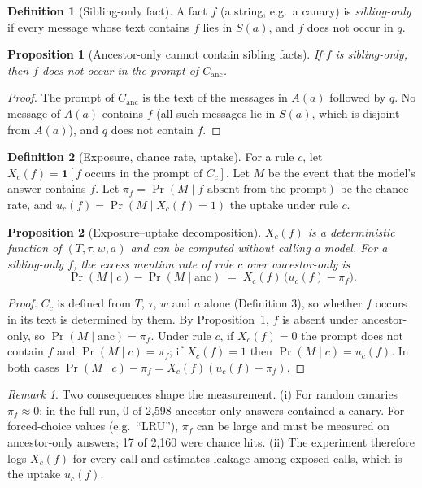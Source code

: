 \documentclass[11pt]{article}
\newtheorem{proposition}{Proposition}
\theoremstyle{definition}
\newtheorem{definition}{Definition}
\theoremstyle{remark}
\newtheorem*{remark}{Remark}
\newcommand{\A}{A(a)}
\newcommand{\Sib}{S(a)}
\newcommand{\w}{w}
\newcommand{\anc}{\mathrm{anc}}
\begin{document}
\begin{definition}[Sibling-only fact]
A fact $f$ (a string, e.g.\ a canary) is \emph{sibling-only} if every message
whose text contains $f$ lies in $\Sib$, and $f$ does not occur in $q$.
\end{definition}

\begin{proposition}[Ancestor-only cannot contain sibling facts]\label{prop:nosib}
If $f$ is sibling-only, then $f$ does not occur in the prompt of $C_\anc$.
\end{proposition}
\begin{proof}
The prompt of $C_\anc$ is the text of the messages in $\A$ followed by $q$.
No message of $\A$ contains $f$ (all such messages lie in $\Sib$, which is
disjoint from $\A$), and $q$ does not contain $f$.
\end{proof}

\begin{definition}[Exposure, chance rate, uptake]
For a rule $c$, let $X_c(f)=\mathbf 1[f\text{ occurs in the prompt of }C_c]$.
Let $M$ be the event that the model's answer contains $f$. Let
$\pi_f=\Pr(M\mid f\text{ absent from the prompt})$ be the chance rate, and
$u_c(f)=\Pr(M\mid X_c(f)=1)$ the uptake under rule $c$.
\end{definition}

\begin{proposition}[Exposure--uptake decomposition]\label{prop:decomp}
$X_c(f)$ is a deterministic function of $(T,\tau,\w,a)$ and can be computed
without calling a model. For a sibling-only $f$, the excess mention rate of
rule $c$ over ancestor-only is
\[
  \Pr(M\mid c)-\Pr(M\mid\anc)\;=\;X_c(f)\,\bigl(u_c(f)-\pi_f\bigr).
\]
\end{proposition}
\begin{proof}
$C_c$ is defined from $T$, $\tau$, $\w$ and $a$ alone (Definition 3), so
whether $f$ occurs in its text is determined by them. By
Proposition~\ref{prop:nosib}, $f$ is absent under ancestor-only, so
$\Pr(M\mid\anc)=\pi_f$. Under rule $c$, if $X_c(f)=0$ the prompt does not contain
$f$ and $\Pr(M\mid c)=\pi_f$; if $X_c(f)=1$ then $\Pr(M\mid c)=u_c(f)$. In both
cases $\Pr(M\mid c)-\pi_f=X_c(f)(u_c(f)-\pi_f)$.
\end{proof}

\begin{remark}
Two consequences shape the measurement. (i) For random canaries
$\pi_f\approx 0$: in the full run, 0 of 2,598 ancestor-only answers contained a
canary. For forced-choice values (e.g.\ ``LRU''), $\pi_f$ can be large and must
be measured on ancestor-only answers; 17 of 2,160 were chance hits. (ii) The
experiment therefore logs $X_c(f)$ for every call and estimates leakage among
exposed calls, which is the uptake $u_c(f)$.
\end{remark}
\end{document}
